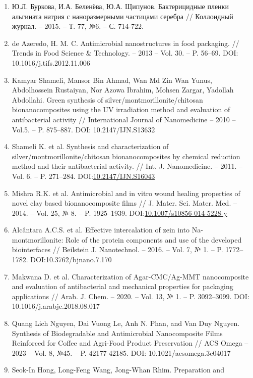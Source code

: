 \begin{references}
\begin{enumerate}
\item
  Ю.Л. Буркова, И.А. Беленёва, Ю.А. Щипунов. Бактерицидные пленки
  альгината натрия с наноразмерными частицами серебра // Коллоидный
  журнал. -- 2015. -- Т. 77, №6. -- С. 714-722.
\item
  de Azeredo, H. M. C. Antimicrobial nanostructures in food packaging.
  // Trends in Food Science \& Technology. -- 2013 -- Vol. 30. -- P.
  56--69. DOI: 10.1016/j.tifs.2012.11.006
\item
  Kamyar Shameli, Mansor Bin Ahmad, Wan Md Zin Wan Yunus, Abdolhossein
  Rustaiyan, Nor Azowa Ibrahim, Mohsen Zargar, Yadollah Abdollahi. Green
  synthesis of silver/montmorillonite/chitosan bionanocomposites using
  the UV irradiation method and evaluation of antibacterial activity //
  International Journal of Nanomedicine -- 2010 -- Vol.5. -- P.
  875--887. DOI: 10.2147/IJN.S13632
\item
  Shameli K. et al. Synthesis and characterization of
  silver/montmorillonite/chitosan bionanocomposites by chemical
  reduction method and their antibacterial activity. // Int. J.
  Nanomedicine. -- 2011. -- Vol. 6. -- P. 271--284.
  DOI:\href{http://dx.doi.org/10.2147/IJN.S16043}{10.2147/IJN.S16043}
\item
  Mishra R.K. et al. Antimicrobial and in vitro wound healing properties
  of novel clay based bionanocomposite films // J. Mater. Sci. Mater.
  Med. -- 2014. -- Vol. 25, № 8. -- P. 1925--1939.
  DOI:\href{http://dx.doi.org/10.1007/s10856-014-5228-y}{10.1007/s10856-014-5228-y}
\item
  Alcântara A.C.S. et al. Effective intercalation of zein into
  Na-montmorillonite: Role of the protein components and use of the
  developed biointerfaces // Beilstein J. Nanotechnol. -- 2016. -- Vol.
  7, № 1. -- P. 1772--1782. DOI:10.3762/bjnano.7.170
\item
  Makwana D. et al. Characterization of Agar-CMC/Ag-MMT nanocomposite
  and evaluation of antibacterial and mechanical properties for
  packaging applications // Arab. J. Chem. -- 2020. -- Vol. 13, № 1. --
  P. 3092--3099. DOI: 10.1016/j.arabjc.2018.08.017
\item
  Quang Lich Nguyen, Dai Vuong Le, Anh N. Phan, and Van Duy Nguyen.
  Synthesis of Biodegradable and Antimicrobial Nanocomposite Films
  Reinforced for Coffee and Agri-Food Product Preservation // ACS Omega
  -- 2023 -- Vol. 8, №45. -- P. 42177-42185. DOI:
  10.1021/acsomega.3c04017
\item
  Seok-In Hong, Long-Feng Wang, Jong-Whan Rhim. Preparation and

\end{enumerate}
\end{references}
